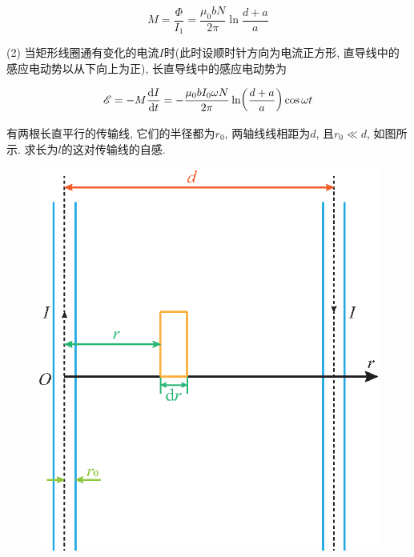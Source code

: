 \begin{example}
\begin{solution}
		\begin{equation*}
			M = \dfrac{\varPhi}{I_1} = \dfrac{\mu_0 b N}{2 \pi} \ln \dfrac{d+a}{a}
		\end{equation*}
		
		(2) 当矩形线圈通有变化的电流$I$时(此时设顺时针方向为电流正方形, 直导线中的感应电动势以从下向上为正), 长直导线中的感应电动势为
		
		\begin{equation*}
			\mathscr{E} = -M\dv{I}{t} = - \dfrac{\mu_0 b I_0 \omega N}{2 \pi} \ln(\dfrac{d+a}{a}) \cos \omega t
		\end{equation*}
		
	\end{solution}
	
\end{example}

\begin{example}
	有两根长直平行的传输线, 它们的半径都为$r_0$, 两轴线线相距为$d$, 且$r_0 \ll d$, 如图所示. 求长为$l$的这对传输线的自感.
	
	\begin{figure}[H]
		\centering
		\includegraphics[scale=0.65]{C9-fig6.eps}
	\end{figure}
	

\end{example}
